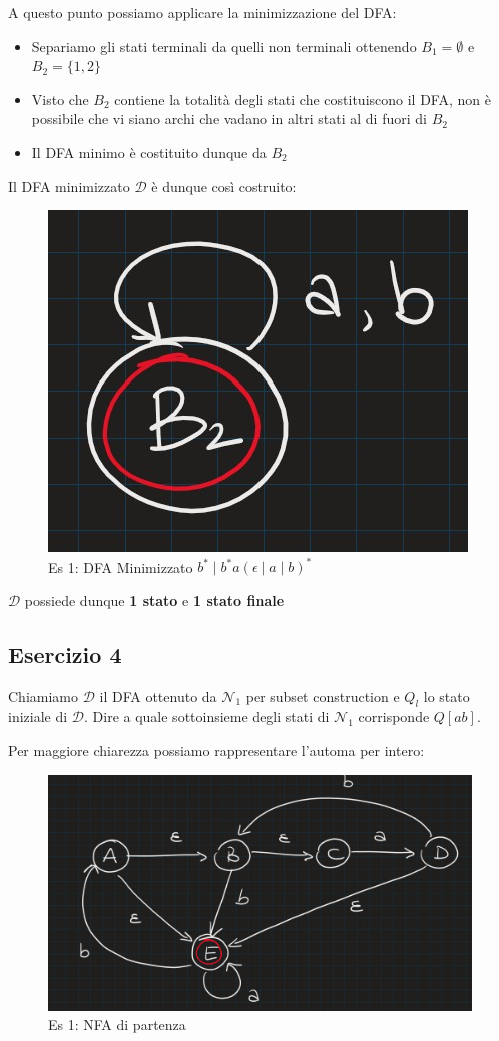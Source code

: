 \documentclass[class=book, crop=false, oneside, 12pt]{standalone}
\begin{document}
A questo punto possiamo applicare la minimizzazione del DFA:

\begin{itemize}
    \item Separiamo gli stati terminali da quelli non terminali ottenendo \(B_1 = \emptyset\) e  \(B_2 = \{1, 2\}\)
    \item Visto che \(B_2\) contiene la totalità degli stati che costituiscono il DFA, non è possibile che vi siano archi che vadano in altri stati al di fuori di \(B_2\)
    \item Il DFA minimo è costituito dunque da \(B_2\)
\end{itemize}

Il DFA minimizzato \(\mathcal{D}\) è dunque così costruito:

\begin{figure}[H]
	\centering
    \includegraphics[width=.3\textwidth]{dfa-minimized-ex3.jpg}
    \caption{Es 1: DFA Minimizzato \(b^* \mid b^* a (\epsilon \mid a \mid b)^*\)}
    \label{fig:dfa-minimized-ex3}
\end{figure}

\(\mathcal{D}\) possiede dunque \textbf{1 stato} e \textbf{1 stato finale}

\subsection{Esercizio 4}

Chiamiamo \(\mathcal{D}\) il DFA ottenuto da \(\mathcal{N}_1\) per subset construction e \(Q_l\) lo stato iniziale di \(\mathcal{D}\).  Dire a quale sottoinsieme degli stati di \(\mathcal{N}_1\) corrisponde \(Q[ab]\).

Per maggiore chiarezza possiamo rappresentare l'automa per intero:

\begin{figure}[H]
	\centering
    \includegraphics[width=.8\textwidth]{nfa-ex4.jpg}
    \caption{Es 1: NFA di partenza}
    \label{fig:nfa-ex4}
\end{figure}
\end{document}
